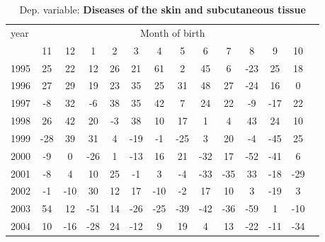  \begin{table}[H] \begin{threeparttable} \centering \caption{Dep. variable: \textbf{Diseases of the skin and subcutaneous tissue}} {\def\sym#1{\ifmmode^{#1}\else\(^{#1}\)\fi} \begin{tabular}{l*{13}{c}} \toprule year & \multicolumn{12}{c}{Month of birth} \\ \cmidrule(lr){2-13} 
            &          11&          12&           1&           2&           3&           4&           5&           6&           7&           8&           9&          10\\
1995        &          25&          22&          12&          26&          21&          61&           2&          45&           6&         -23&          25&          18\\
1996        &          27&          29&          19&          23&          35&          25&          31&          48&          27&         -24&          16&           0\\
1997        &          -8&          32&          -6&          38&          35&          42&           7&          24&          22&          -9&         -17&          22\\
1998        &          26&          42&          20&          -3&          38&          10&          17&           1&           4&          43&          24&          10\\
1999        &         -28&          39&          31&           4&         -19&          -1&         -25&           3&          20&          -4&         -45&          25\\
2000        &          -9&           0&         -26&           1&         -13&          16&          21&         -32&          17&         -52&         -41&           6\\
2001        &          -8&           4&          10&          25&          -1&           3&          -4&         -33&         -35&          33&         -18&         -29\\
2002        &          -1&         -10&          30&          12&          17&         -10&          -2&          17&          10&           3&         -19&           3\\
2003        &          54&          12&         -51&          14&         -26&         -25&         -39&         -42&         -36&         -59&           1&         -10\\
2004        &          10&         -16&         -28&          24&         -12&           9&          19&           4&          13&         -22&         -11&         -34\\

\end{tabular}}
\end{threeparttable}
\end{table}
